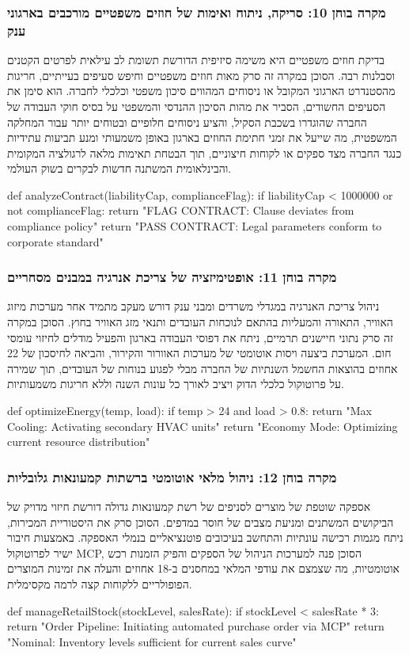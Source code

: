 \documentclass{hebrew-academic-template}
\begin{document}
\subsubsection{מקרה בוחן 10: סריקה, ניתוח ואימות של חוזים משפטיים מורכבים בארגוני ענק}
בדיקת חוזים משפטיים היא משימה סיזיפית הדורשת תשומת לב עילאית לפרטים הקטנים וסבלנות רבה. הסוכן במקרה זה סרק מאות חוזים משפטיים וחיפש סעיפים בעייתיים, חריגות מהסטנדרט הארגוני המקובל או ניסוחים המהווים סיכון משפטי וכלכלי לחברה. הוא סימן את הסעיפים החשודים, הסביר את מהות הסיכון ההנדסי והמשפטי על בסיס חוקי העבודה של החברה שהוגדרו בשכבת הסקיל, והציע ניסוחים חלופיים ובטוחים יותר עבור המחלקה המשפטית, מה שייעל את זמני חתימת החוזים בארגון באופן משמעותי ומנע תביעות עתידיות כנגד החברה מצד ספקים או לקוחות חיצוניים, תוך הבטחת תאימות מלאה לרגולציה המקומית והבינלאומית המשתנה חדשות לבקרים בשוק העולמי.
\begin{pythonbox}
def analyzeContract(liabilityCap, complianceFlag):
    if liabilityCap < 1000000 or not complianceFlag:
        return "FLAG CONTRACT: Clause deviates from compliance policy"
    return "PASS CONTRACT: Legal parameters conform to corporate standard"
\end{pythonbox}

\subsubsection{מקרה בוחן 11: אופטימיזציה של צריכת אנרגיה במבנים מסחריים}
ניהול צריכת האנרגיה במגדלי משרדים ומבני ענק דורש מעקב מתמיד אחר מערכות מיזוג האוויר, התאורה והמעליות בהתאם לנוכחות העובדים ותנאי מזג האוויר בחוץ. הסוכן במקרה זה סרק נתוני חיישנים תרמיים, ניתח את דפוסי העבודה בארגון והפעיל מודלים לחיזוי עומסי חום. המערכת ביצעה ויסות אוטומטי של מערכות האוורור והקירור, והביאה לחיסכון של 22 אחוזים בהוצאות החשמל השנתיות של החברה מבלי לפגוע בנוחות של העובדים, תוך שמירה על פרוטוקול כלכלי הדוק ויציב לאורך כל עונות השנה וללא חריגות משמעותיות.
\begin{pythonbox}
def optimizeEnergy(temp, load):
    if temp > 24 and load > 0.8:
        return "Max Cooling: Activating secondary HVAC units"
    return "Economy Mode: Optimizing current resource distribution"
\end{pythonbox}

\subsubsection{מקרה בוחן 12: ניהול מלאי אוטומטי ברשתות קמעונאות גלובליות}
אספקה שוטפת של מוצרים לסניפים של רשת קמעונאות גדולה דורשת חיזוי מדויק של הביקושים המשתנים ומניעת מצבים של חוסר במדפים. הסוכן סרק את היסטוריית המכירות, ניתח מגמות רכישה עונתיות והתחשב בעיכובים פוטנציאליים בנמלי האספקה. באמצעות חיבור ישיר לפרוטוקול MCP, הסוכן פנה למערכות הניהול של הספקים והפיק הזמנות רכש אוטומטיות, מה שצמצם את עודפי המלאי במחסנים ב-18 אחוזים והעלה את זמינות המוצרים הפופולריים ללקוחות קצה לרמה מקסימלית.
\begin{pythonbox}
def manageRetailStock(stockLevel, salesRate):
    if stockLevel < salesRate * 3:
        return "Order Pipeline: Initiating automated purchase order via MCP"
    return "Nominal: Inventory levels sufficient for current sales curve"
\end{pythonbox}
\end{document}
